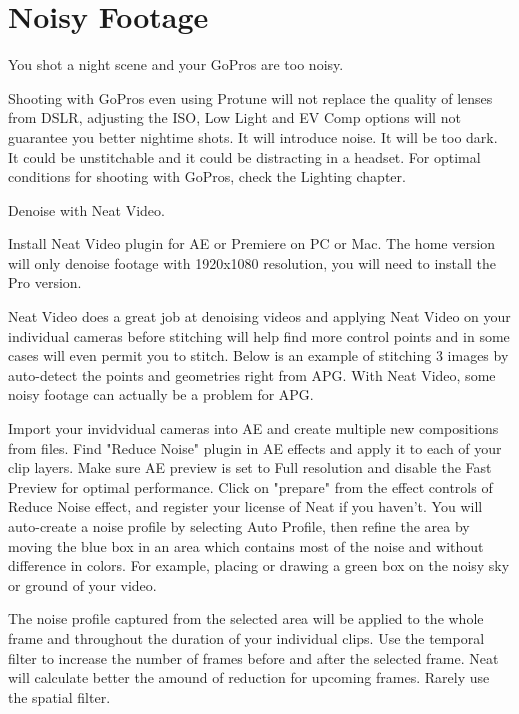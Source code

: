 \chapter{Noisy Footage}
\pagecolor{white}
\label{chap:55}
\begin{fullwidth}

\problem

{\large You shot a night scene and your GoPros are too noisy. \par}

Shooting with GoPros even using Protune will not replace the quality of lenses from DSLR, adjusting the ISO, Low Light and EV Comp options will not guarantee you better nightime shots. It will introduce noise. It will be too dark. It could be unstitchable and it could be distracting in a headset. For optimal conditions for shooting with GoPros, check the Lighting chapter.

\solutions

{\large Denoise with Neat Video. \par}

Install Neat Video plugin for AE or Premiere on PC or Mac. The home version will only denoise footage with 1920x1080 resolution, you will need to install the Pro version. 

Neat Video does a great job at denoising videos and applying Neat Video on your individual cameras before stitching will help find more control points and in some cases will even permit you to stitch. Below is an example of stitching 3 images by auto-detect the points and geometries right from APG. With Neat Video, some noisy footage can actually be a problem for APG.


Import your invidvidual cameras into AE and create multiple new compositions from files. Find "Reduce Noise" plugin in AE effects and apply it to each of your clip layers. Make sure AE preview is set to Full resolution and disable the Fast Preview for optimal performance. Click on "prepare" from the effect controls of Reduce Noise effect, and register your license of Neat if you haven't. You will auto-create a noise profile by selecting Auto Profile, then refine the area by moving the blue box in an area which contains most of the noise and without difference in colors. For example, placing or drawing a green box on the noisy sky or ground of your video.  


The noise profile captured from the selected area will be applied to the whole frame and throughout the duration of your individual clips. Use the temporal filter to increase the number of frames before and after the selected frame. Neat will calculate better the amound of reduction for upcoming frames. Rarely use the spatial filter.


\end{fullwidth}

